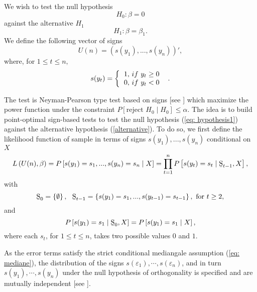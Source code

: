\documentclass[harvard,11pt]{article}
\begin{document}
We wish to test the null hypothesis%
\begin{equation}
\left. H_{0}:\beta =0\right.   \label{eq: hypothesis1}
\end{equation}%
against the alternative $H_{1}$%
\begin{equation}
\left. H_{1}:\beta =\beta _{1}.\right.   \label{alternative}
\end{equation}%
We define the following vector of signs%
\begin{equation*}
U(n)=(s(y_{1}),...,s(y_{n}))',
\end{equation*}%
where, for $1\leq t\leq n,$%
\begin{equation*}
s(y_{t})=\left\{ 
\begin{tabular}{l}
$1,$ $if$ $y_{t}\geq 0$ \\ 
$0,$ $if$ $y_{t}<0$%
\end{tabular}%
\ \right. \text{.}
\end{equation*}

The test is Neyman-Pearson type test based on signs [see \citet{lehmann2006testing}] which maximize the
power function under the constraint $P\left[ \text{reject }%
H_{0}\mid H_{0}\right] \leq \alpha$. The idea is to build		
point-optimal sign-based tests to test the null hypothesis (\ref{eq:
hypothesis1}) against the alternative hypothesis (\ref{alternative}). To do
so, we first define the likelihood function of sample in terms of signs $%
s(y_{1}),...,s(y_{n})$ conditional on $X$%
\begin{equation*}
L\left( U(n),\beta \right) =P\left[
s(y_{1})=s_{1},...,s(y_{n})=s_{n}\mid X\right] =\prod\limits_{t=1}^{n} P\left[ s(y_{t})=s_{t}\mid \text{\b{S}}_{t-1}, X\right] ,
\end{equation*}%
with 
\begin{equation*}
\text{\b{S}}_{0}=\left\{ \emptyset \right\} ,\text{ \ \b{S}}_{t-1}=\left\{
s(y_{1})=s_{1},...,s(y_{t-1})=s_{t-1}\right\} ,\text{ for }t\geq 2,
\end{equation*}%
and%
\begin{equation*}
P\left[ s(y_{1})=s_{1}\mid \text{\b{S}}_{0},X\right] =P%
\left[ s(y_{1})=s_{1}\mid X\right] ,
\end{equation*}%
where each $s_{t}$, for $1\leq t\leq n$, takes two possible values $0$ and $1
$. 

 As the error terms satisfy the strict conditional mediangale assumption (\ref{eq: mediane}), the distribution of the signs $s(\varepsilon_1),\cdots,s(\varepsilon_n)$, and in turn $s(y_1),\cdots, s(y_n)$ under the null hypothesis of orthogonality is specified and are mutually independent [see \citet{coudin2009finite}].
\end{document}
